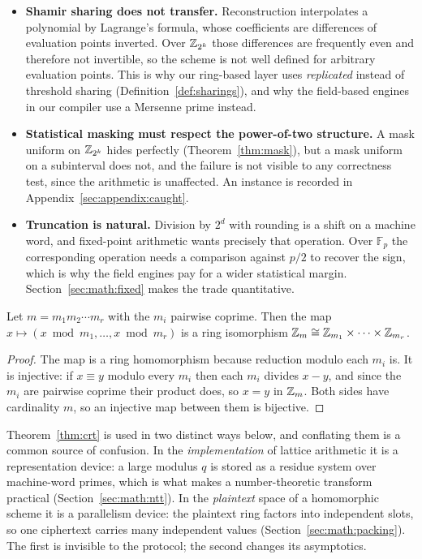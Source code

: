 \begin{itemize}
  \item \textbf{Shamir sharing does not transfer.} Reconstruction interpolates a
  polynomial by Lagrange's formula, whose coefficients are differences of
  evaluation points inverted. Over $\mathbb{Z}_{2^k}$ those differences are frequently
  even and therefore not invertible, so the scheme is not well defined for
  arbitrary evaluation points. This is why our ring-based layer uses
  \emph{replicated} instead of threshold sharing
  (Definition~\ref{def:sharings}), and why the field-based engines in our
  compiler use a Mersenne prime instead.
  \item \textbf{Statistical masking must respect the power-of-two structure.} A
  mask uniform on $\mathbb{Z}_{2^k}$ hides perfectly (Theorem~\ref{thm:mask}), but a mask
  uniform on a subinterval does not, and the failure is not visible to any
  correctness test, since the arithmetic is unaffected. An instance is recorded in
  Appendix~\ref{sec:appendix:caught}.
  \item \textbf{Truncation is natural.} Division by $2^d$ with rounding is a shift
  on a machine word, and fixed-point arithmetic wants precisely that operation.
  Over $\mathbb{F}_p$ the corresponding operation needs a comparison against
  $p/2$ to recover the sign, which is why the field engines pay for a wider
  statistical margin. Section~\ref{sec:math:fixed} makes the trade quantitative.
\end{itemize}

\begin{theorem}
\label{thm:crt}
Let $m = m_1 m_2 \cdots m_r$ with the $m_i$ pairwise coprime. Then the map
$x \mapsto (x \bmod m_1, \dots, x \bmod m_r)$ is a ring isomorphism
$\mathbb{Z}_m \cong \mathbb{Z}_{m_1} \times \cdots \times \mathbb{Z}_{m_r}$.
\end{theorem}

\begin{proof}
The map is a ring homomorphism because reduction modulo each $m_i$ is. It is
injective: if $x \equiv y$ modulo every $m_i$ then each $m_i$ divides $x-y$, and
since the $m_i$ are pairwise coprime their product does, so $x = y$ in $\mathbb{Z}_m$.
Both sides have cardinality $m$, so an injective map between them is bijective.
\end{proof}

Theorem~\ref{thm:crt} is used in two distinct ways below, and conflating them is a
common source of confusion. In the \emph{implementation} of lattice arithmetic it
is a representation device: a large modulus $q$ is stored as a residue system over
machine-word primes, which is what makes a number-theoretic transform practical
(Section~\ref{sec:math:ntt}). In the \emph{plaintext} space of a homomorphic
scheme it is a parallelism device: the plaintext ring factors into independent
slots, so one ciphertext carries many independent values
(Section~\ref{sec:math:packing}). The first is invisible to the protocol; the
second changes its asymptotics.

